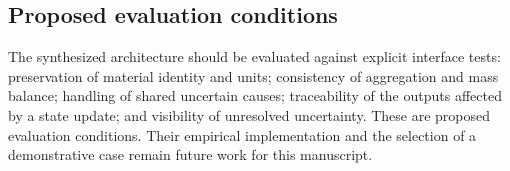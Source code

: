 \subsection{Proposed evaluation conditions}
The synthesized architecture should be evaluated against explicit interface tests: preservation of material identity and units; consistency of aggregation and mass balance; handling of shared uncertain causes; traceability of the outputs affected by a state update; and visibility of unresolved uncertainty. These are proposed evaluation conditions. Their empirical implementation and the selection of a demonstrative case remain future work for this manuscript.
